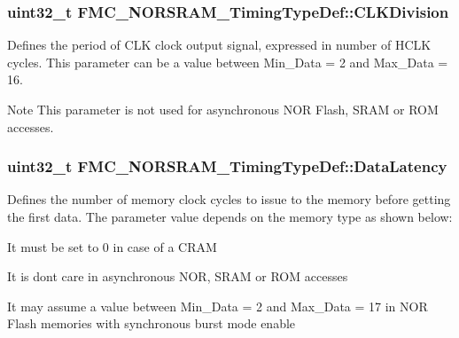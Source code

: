 \subsubsection[{\texorpdfstring{C\+L\+K\+Division}{CLKDivision}}]{\setlength{\rightskip}{0pt plus 5cm}uint32\+\_\+t F\+M\+C\+\_\+\+N\+O\+R\+S\+R\+A\+M\+\_\+\+Timing\+Type\+Def\+::\+C\+L\+K\+Division}\hypertarget{struct_f_m_c___n_o_r_s_r_a_m___timing_type_def_a093fa589f174cde14dbc2c6caeee08ff}{}\label{struct_f_m_c___n_o_r_s_r_a_m___timing_type_def_a093fa589f174cde14dbc2c6caeee08ff}
Defines the period of C\+LK clock output signal, expressed in number of H\+C\+LK cycles. This parameter can be a value between Min\+\_\+\+Data = 2 and Max\+\_\+\+Data = 16. \begin{DoxyNote}{Note}
This parameter is not used for asynchronous N\+OR Flash, S\+R\+AM or R\+OM accesses. 
\end{DoxyNote}
\subsubsection[{\texorpdfstring{Data\+Latency}{DataLatency}}]{\setlength{\rightskip}{0pt plus 5cm}uint32\+\_\+t F\+M\+C\+\_\+\+N\+O\+R\+S\+R\+A\+M\+\_\+\+Timing\+Type\+Def\+::\+Data\+Latency}\hypertarget{struct_f_m_c___n_o_r_s_r_a_m___timing_type_def_ad747ab03382954e5b7db99c1448f8a88}{}\label{struct_f_m_c___n_o_r_s_r_a_m___timing_type_def_ad747ab03382954e5b7db99c1448f8a88}
Defines the number of memory clock cycles to issue to the memory before getting the first data. The parameter value depends on the memory type as shown below\+:
\begin{DoxyItemize}
\item It must be set to 0 in case of a C\+R\+AM
\item It is don\textquotesingle{}t care in asynchronous N\+OR, S\+R\+AM or R\+OM accesses
\item It may assume a value between Min\+\_\+\+Data = 2 and Max\+\_\+\+Data = 17 in N\+OR Flash memories with synchronous burst mode enable 
\end{DoxyItemize}
